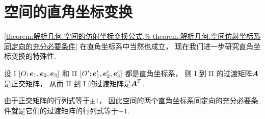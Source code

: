 \section{空间的直角坐标变换}
\cref{theorem:解析几何.空间的仿射坐标变换公式,%
theorem:解析几何.空间仿射坐标系同定向的充分必要条件}
在直角坐标系中当然也成立，
现在我们进一步研究直角坐标变换的特殊性.

\begin{theorem}
设 I \([O;\boldsymbol{e}_1,\boldsymbol{e}_2,\boldsymbol{e}_3]\)
和 II \([O';\boldsymbol{e}_1',\boldsymbol{e}_2',\boldsymbol{e}_3']\)
都是直角坐标系，
则 I 到 II 的过渡矩阵\(\boldsymbol{A}\)是正交矩阵，
从而 II 到 I 的过渡矩阵是\(\boldsymbol{A}^T\).
\end{theorem}

由于正交矩阵的行列式等于\(\pm1\)，
因此空间的两个直角坐标系同定向的充分必要条件就是它们的过渡矩阵的行列式等于\(+1\).
